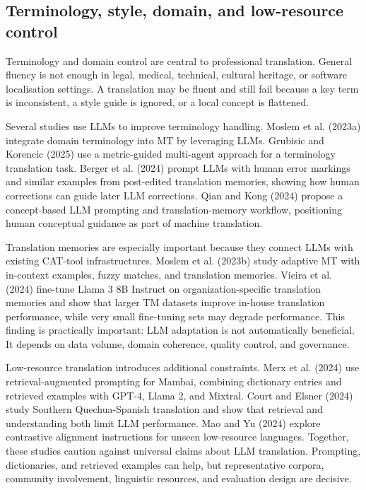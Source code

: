 \documentclass[11pt]{article}
\begin{document}
\subsection{Terminology, style, domain, and low-resource control}
Terminology and domain control are central to professional translation. General fluency is not enough in legal, medical, technical, cultural heritage, or software localisation settings. A translation may be fluent and still fail because a key term is inconsistent, a style guide is ignored, or a local concept is flattened.

Several studies use LLMs to improve terminology handling. Moslem et al. (2023a) integrate domain terminology into MT by leveraging LLMs. Grubisic and Korencic (2025) use a metric-guided multi-agent approach for a terminology translation task. Berger et al. (2024) prompt LLMs with human error markings and similar examples from post-edited translation memories, showing how human corrections can guide later LLM corrections. Qian and Kong (2024) propose a concept-based LLM prompting and translation-memory workflow, positioning human conceptual guidance as part of machine translation.

Translation memories are especially important because they connect LLMs with existing CAT-tool infrastructures. Moslem et al. (2023b) study adaptive MT with in-context examples, fuzzy matches, and translation memories. Vieira et al. (2024) fine-tune Llama 3 8B Instruct on organization-specific translation memories and show that larger TM datasets improve in-house translation performance, while very small fine-tuning sets may degrade performance. This finding is practically important: LLM adaptation is not automatically beneficial. It depends on data volume, domain coherence, quality control, and governance.

Low-resource translation introduces additional constraints. Merx et al. (2024) use retrieval-augmented prompting for Mambai, combining dictionary entries and retrieved examples with GPT-4, Llama 2, and Mixtral. Court and Elsner (2024) study Southern Quechua-Spanish translation and show that retrieval and understanding both limit LLM performance. Mao and Yu (2024) explore contrastive alignment instructions for unseen low-resource languages. Together, these studies caution against universal claims about LLM translation. Prompting, dictionaries, and retrieved examples can help, but representative corpora, community involvement, linguistic resources, and evaluation design are decisive.
\end{document}
